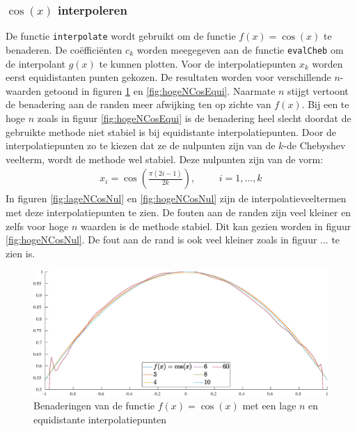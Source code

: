\documentclass[a4paper, 12pt, titlepage, fleqn]{article}
\begin{document}
\subsubsection{$\cos(x)$ interpoleren}
\label{cosInterpoleren}
De functie \texttt{interpolate} wordt gebruikt om de functie $f(x) = \cos(x)$ te benaderen. De co\"effici\"enten $c_k$ worden meegegeven aan de functie \texttt{evalCheb} om de interpolant $g(x)$ te kunnen plotten. Voor de interpolatiepunten $x_k$ worden eerst equidistanten punten gekozen. De resultaten worden voor verschillende $n$-waarden getoond in figuren \ref{lageNCosEqui} en \ref{fig:hogeNCosEqui}. Naarmate $n$ stijgt vertoont de benadering aan de randen meer afwijking ten op zichte van $f(x)$. Bij een te hoge $n$ zoals in figuur \ref{fig:hogeNCosEqui} is de benadering heel slecht doordat de gebruikte methode niet stabiel is bij equidistante interpolatiepunten. Door de interpolatiepunten zo te kiezen dat ze de nulpunten zijn van de $k$-de Chebyshev veelterm, wordt de methode wel stabiel. Deze nulpunten zijn van de vorm:
\begin{align*}
x_i = \cos\left(\frac{\pi(2i-1)}{2k}\right), \hspace{1cm} i = 1,\ldots,k
\end{align*}
In figuren \ref{fig:lageNCosNul} en \ref{fig:hogeNCosNul} zijn de interpolatieveeltermen met deze interpolatiepunten te zien. De fouten aan de randen zijn veel kleiner en zelfs voor hoge $n$ waarden is de methode stabiel. Dit kan gezien worden in figuur \ref{fig:hogeNCosNul}. De fout aan de rand is ook veel kleiner zoals in figuur ... te zien is.


\begin{figure}
\centering
\includegraphics[scale=0.4]{../Afbeeldingen/cos_equi_laag.eps}
\caption{Benaderingen van de functie $f(x) = \cos(x)$ met een lage $n$ en equidistante interpolatiepunten}
\label{lageNCosEqui}
\end{figure}
\end{document}
